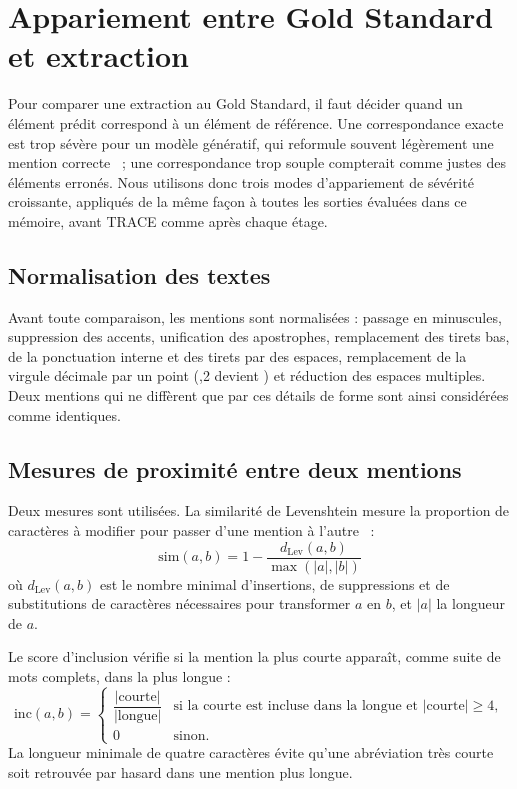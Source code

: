 \section{Appariement entre Gold Standard et extraction}\label{sec:c4-matching}

Pour comparer une extraction au Gold Standard, il faut décider quand un élément prédit correspond à un élément de référence. Une correspondance exacte est trop sévère pour un modèle génératif, qui reformule souvent légèrement une mention correcte~\cite{wadhwa2023revisiting} ; une correspondance trop souple compterait comme justes des éléments erronés. Nous utilisons donc trois modes d'appariement de sévérité croissante, appliqués de la même façon à toutes les sorties évaluées dans ce mémoire, avant TRACE comme après chaque étage.

\subsection{Normalisation des textes}

Avant toute comparaison, les mentions sont normalisées : passage en minuscules, suppression des accents, unification des apostrophes, remplacement des tirets bas, de la ponctuation interne et des tirets par des espaces, remplacement de la virgule décimale par un point (,2 \fg{} devient  \fg{}) et réduction des espaces multiples. Deux mentions qui ne diffèrent que par ces détails de forme sont ainsi considérées comme identiques.

\subsection{Mesures de proximité entre deux mentions}

Deux mesures sont utilisées. La similarité de Levenshtein mesure la proportion de caractères à modifier pour passer d'une mention à l'autre~\cite{levenshtein1966} :
\begin{equation}
\mathrm{sim}(a, b) = 1 - \frac{d_{\mathrm{Lev}}(a, b)}{\max(|a|, |b|)}
\end{equation}
où $d_{\mathrm{Lev}}(a,b)$ est le nombre minimal d'insertions, de suppressions et de substitutions de caractères nécessaires pour transformer $a$ en $b$, et $|a|$ la longueur de $a$.

Le score d'inclusion vérifie si la mention la plus courte apparaît, comme suite de mots complets, dans la plus longue :
\begin{equation}
\mathrm{inc}(a, b) =
\begin{cases}
\dfrac{|\text{courte}|}{|\text{longue}|} & \text{si la courte est incluse dans la longue et } |\text{courte}| \geq 4,\\[2mm]
0 & \text{sinon.}
\end{cases}
\end{equation}
La longueur minimale de quatre caractères évite qu'une abréviation très courte soit retrouvée par hasard dans une mention plus longue.

